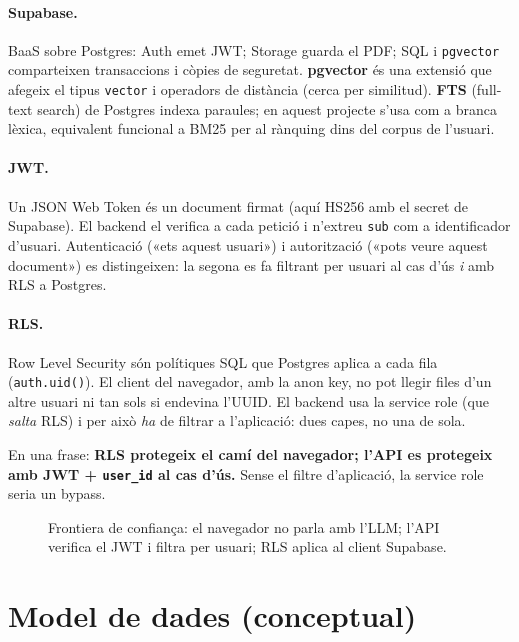 \paragraph{Supabase.}
BaaS sobre Postgres: Auth emet JWT; Storage guarda el PDF; SQL i \texttt{pgvector} comparteixen transaccions i còpies de seguretat. \textbf{pgvector} és una extensió que afegeix el tipus \texttt{vector} i operadors de distància (cerca per similitud). \textbf{FTS} (full-text search) de Postgres indexa paraules; en aquest projecte s'usa com a branca lèxica, equivalent funcional a BM25 per al rànquing dins del corpus de l'usuari.

\paragraph{JWT.}
Un JSON Web Token és un document firmat (aquí HS256 amb el secret de Supabase). El backend el verifica a cada petició i n'extreu \texttt{sub} com a identificador d'usuari. Autenticació («ets aquest usuari») i autorització («pots veure aquest document») es distingeixen: la segona es fa filtrant per usuari al cas d'ús \emph{i} amb RLS a Postgres.

\paragraph{RLS.}
Row Level Security són polítiques SQL que Postgres aplica a cada fila (\texttt{auth.uid()}). El client del navegador, amb la anon key, no pot llegir files d'un altre usuari ni tan sols si endevina l'UUID. El backend usa la service role (que \emph{salta} RLS) i per això \emph{ha} de filtrar a l'aplicació: dues capes, no una de sola.

En una frase: \textbf{RLS protegeix el camí del navegador; l'API es protegeix amb JWT + \texttt{user\_id} al cas d'ús.} Sense el filtre d'aplicació, la service role seria un bypass.

\begin{figure}[htbp]
\centering

\caption{Frontiera de confiança: el navegador no parla amb l'LLM; l'API verifica el JWT i filtra per usuari; RLS aplica al client Supabase.}
\label{fig:trust}
\end{figure}

\section{Model de dades (conceptual)}
\label{sec:model-dades}

